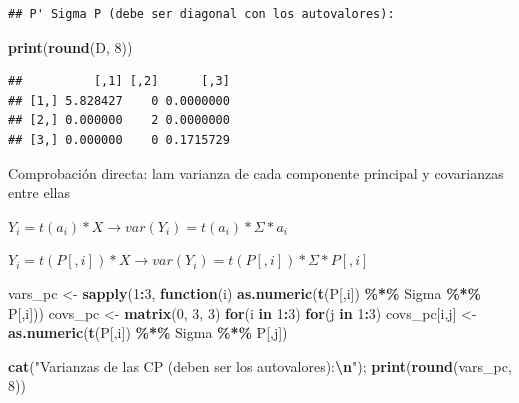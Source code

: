 \documentclass[
]{book}
\newenvironment{Shaded}{\begin{snugshade}}{\end{snugshade}}
\newcommand{\ControlFlowTok}[1]{\textcolor[rgb]{0.13,0.29,0.53}{\textbf{#1}}}
\newcommand{\DecValTok}[1]{\textcolor[rgb]{0.00,0.00,0.81}{#1}}
\newcommand{\FunctionTok}[1]{\textcolor[rgb]{0.13,0.29,0.53}{\textbf{#1}}}
\newcommand{\NormalTok}[1]{#1}
\newcommand{\OtherTok}[1]{\textcolor[rgb]{0.56,0.35,0.01}{#1}}
\newcommand{\SpecialCharTok}[1]{\textcolor[rgb]{0.81,0.36,0.00}{\textbf{#1}}}
\newcommand{\StringTok}[1]{\textcolor[rgb]{0.31,0.60,0.02}{#1}}
\begin{document}
\begin{verbatim}
## P' Sigma P (debe ser diagonal con los autovalores):
\end{verbatim}

\begin{Shaded}
\begin{Highlighting}[]
\FunctionTok{print}\NormalTok{(}\FunctionTok{round}\NormalTok{(D, }\DecValTok{8}\NormalTok{))}
\end{Highlighting}
\end{Shaded}

\begin{verbatim}
##          [,1] [,2]      [,3]
## [1,] 5.828427    0 0.0000000
## [2,] 0.000000    2 0.0000000
## [3,] 0.000000    0 0.1715729
\end{verbatim}

Comprobación directa: lam varianza de cada componente principal y covarianzas entre ellas

\(Y_i = t(a_i) * X \rightarrow var(Y_i) = t(a_i) * \Sigma * a_i\)

\(Y_i = t(P[,i]) * X \rightarrow var(Y_i) = t(P[,i]) * \Sigma * P[,i]\)

\begin{Shaded}
\begin{Highlighting}[]
\NormalTok{vars\_pc }\OtherTok{\textless{}{-}} \FunctionTok{sapply}\NormalTok{(}\DecValTok{1}\SpecialCharTok{:}\DecValTok{3}\NormalTok{, }\ControlFlowTok{function}\NormalTok{(i) }\FunctionTok{as.numeric}\NormalTok{(}\FunctionTok{t}\NormalTok{(P[,i]) }\SpecialCharTok{\%*\%}\NormalTok{ Sigma }\SpecialCharTok{\%*\%}\NormalTok{ P[,i]))}
\NormalTok{covs\_pc }\OtherTok{\textless{}{-}} \FunctionTok{matrix}\NormalTok{(}\DecValTok{0}\NormalTok{, }\DecValTok{3}\NormalTok{, }\DecValTok{3}\NormalTok{)}
\ControlFlowTok{for}\NormalTok{(i }\ControlFlowTok{in} \DecValTok{1}\SpecialCharTok{:}\DecValTok{3}\NormalTok{) }\ControlFlowTok{for}\NormalTok{(j }\ControlFlowTok{in} \DecValTok{1}\SpecialCharTok{:}\DecValTok{3}\NormalTok{) covs\_pc[i,j] }\OtherTok{\textless{}{-}} \FunctionTok{as.numeric}\NormalTok{(}\FunctionTok{t}\NormalTok{(P[,i]) }\SpecialCharTok{\%*\%}\NormalTok{ Sigma }\SpecialCharTok{\%*\%}\NormalTok{ P[,j])}

\FunctionTok{cat}\NormalTok{(}\StringTok{"Varianzas de las CP (deben ser los autovalores):}\SpecialCharTok{\textbackslash{}n}\StringTok{"}\NormalTok{); }\FunctionTok{print}\NormalTok{(}\FunctionTok{round}\NormalTok{(vars\_pc, }\DecValTok{8}\NormalTok{))}
\end{Highlighting}
\end{Shaded}
\end{document}
